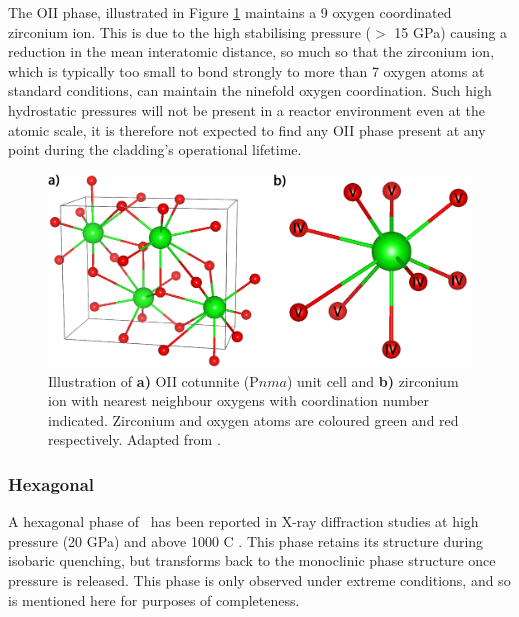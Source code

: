 The OII phase, illustrated in Figure \ref{fig:cotunnite_structure} maintains a 9 oxygen coordinated zirconium ion. This is due to the high stabilising pressure ($>$ 15 GPa) causing a reduction in the mean interatomic distance, so much so that the zirconium ion, which is typically too small to bond strongly to more than 7 oxygen atoms at standard conditions, can maintain the ninefold oxygen coordination. Such high hydrostatic pressures will not be present in a reactor environment even at the atomic scale, it is therefore not expected to find any OII phase present at any point during the cladding's operational lifetime.

\begin{figure}[ht]
  \centering
      \includegraphics[width=\linewidth]{images/cotunnite_lex.png}
  \caption[Illustration of \textbf{a)} OII cotunnite (P$nma$) unit cell and \textbf{b)} zirconium ion with nearest neighbour oxygens with coordination number indicated. Zirconium and oxygen ions are shaded dark and light respectively.]{Illustration of \textbf{a)} OII cotunnite (P$nma$) unit cell and \textbf{b)} zirconium ion with nearest neighbour oxygens with coordination number indicated. Zirconium and oxygen atoms are coloured green and red respectively. Adapted from \cite{Haines1997}.}
  \label{fig:cotunnite_structure}
\end{figure}

\subsubsection{Hexagonal}

A hexagonal phase of \zirconia\ has been reported in X-ray diffraction studies at high pressure (20 GPa) and above 1000 \textdegree C \cite{ohtaka1994new}. This phase retains its structure during isobaric quenching, but transforms back to the monoclinic phase structure once pressure is released. This phase is only observed under extreme conditions, and so is mentioned here for purposes of completeness.

